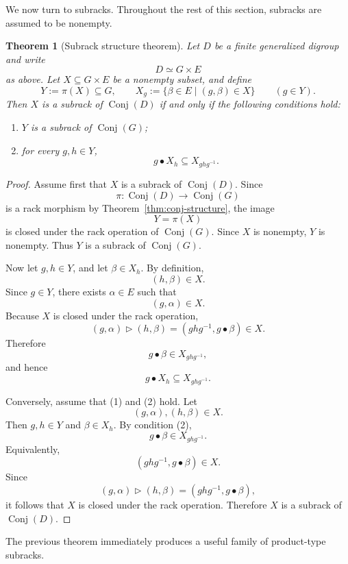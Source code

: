 \documentclass[11pt]{article}
\theoremstyle{plain}
\newtheorem{theorem}{Theorem}[section]
\theoremstyle{definition}
\theoremstyle{remark}
\DeclareMathOperator{\Conj}{Conj}
\begin{document}
	We now turn to subracks. Throughout the rest of this section, subracks are
	assumed to be nonempty.
	
	\begin{theorem}[Subrack structure theorem]\label{thm:subrack-structure}
		Let \(D\) be a finite generalized digroup and write
		\[
		D\simeq G\times E
		\]
		as above. Let \(X\subseteq G\times E\) be a nonempty subset, and define
		\[
		Y:=\pi(X)\subseteq G,
		\qquad
		X_g:=\{\beta\in E\mid (g,\beta)\in X\}
		\qquad
		(g\in Y).
		\]
		Then \(X\) is a subrack of \(\Conj(D)\) if and only if the following
		conditions hold:
		\begin{enumerate}
			\item \(Y\) is a subrack of \(\Conj(G)\);
			\item for every \(g,h\in Y\),
			\[
			g\bullet X_h\subseteq X_{ghg^{-1}}.
			\]
		\end{enumerate}
	\end{theorem}
	
	\begin{proof}
		Assume first that \(X\) is a subrack of \(\Conj(D)\). Since
		\[
		\pi:\Conj(D)\longrightarrow\Conj(G)
		\]
		is a rack morphism by Theorem~\ref{thm:conj-structure}, the image
		\[
		Y=\pi(X)
		\]
		is closed under the rack operation of \(\Conj(G)\). Since \(X\) is
		nonempty, \(Y\) is nonempty. Thus \(Y\) is a subrack of \(\Conj(G)\).
		
		Now let \(g,h\in Y\), and let \(\beta\in X_h\). By definition,
		\[
		(h,\beta)\in X.
		\]
		Since \(g\in Y\), there exists \(\alpha\in E\) such that
		\[
		(g,\alpha)\in X.
		\]
		Because \(X\) is closed under the rack operation,
		\[
		(g,\alpha)\triangleright(h,\beta)
		=
		(ghg^{-1},g\bullet\beta)
		\in X.
		\]
		Therefore
		\[
		g\bullet\beta\in X_{ghg^{-1}},
		\]
		and hence
		\[
		g\bullet X_h\subseteq X_{ghg^{-1}}.
		\]
		
		Conversely, assume that (1) and (2) hold. Let
		\[
		(g,\alpha),(h,\beta)\in X.
		\]
		Then \(g,h\in Y\) and \(\beta\in X_h\). By condition (2),
		\[
		g\bullet\beta\in X_{ghg^{-1}}.
		\]
		Equivalently,
		\[
		(ghg^{-1},g\bullet\beta)\in X.
		\]
		Since
		\[
		(g,\alpha)\triangleright(h,\beta)
		=
		(ghg^{-1},g\bullet\beta),
		\]
		it follows that \(X\) is closed under the rack operation. Therefore \(X\)
		is a subrack of \(\Conj(D)\).
	\end{proof}
	
	The previous theorem immediately produces a useful family of product-type
	subracks.
	
\end{document}
